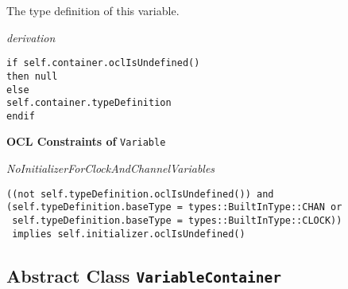 \begin{longdescription}
\begin{longdescription}
		The type definition of this variable.		
		\begin{longdescription}
	\item[\small\textit{derivation}] ~ 
	\nopagebreak
		\begin{lstlisting}[language=OCL, breaklines=true]
if self.container.oclIsUndefined()
then null 
else 
self.container.typeDefinition 
endif		\end{lstlisting}
		\end{longdescription}
			\end{longdescription}
			\item[\textbf{OCL Constraints of} \texttt{Variable}] ~
			\begin{longdescription}
	\item[\small\textit{NoInitializerForClockAndChannelVariables}] ~ 
	\nopagebreak
	
		\begin{lstlisting}[breaklines=true]
((not self.typeDefinition.oclIsUndefined()) and
(self.typeDefinition.baseType = types::BuiltInType::CHAN or
 self.typeDefinition.baseType = types::BuiltInType::CLOCK))
 implies self.initializer.oclIsUndefined()		\end{lstlisting}
			\end{longdescription}
	
	\end{longdescription}
	

\subsection{Abstract Class \bfseries \texttt{VariableContainer}\normalfont}
\label{cls:uppaal::declarations::VariableContainer} 
	
